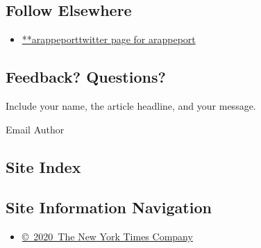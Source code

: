 \hypertarget{follow-elsewhere}{%
\subsection{Follow Elsewhere}\label{follow-elsewhere}}

\begin{itemize}
\tightlist
\item
  \href{https://twitter.com/arappeport}{**arappeporttwitter page for
  arappeport}
\end{itemize}

\hypertarget{feedback-questions}{%
\subsection{Feedback? Questions?}\label{feedback-questions}}

Include your name, the article headline, and your message.

Email Author

\hypertarget{site-index}{%
\subsection{Site Index}\label{site-index}}

\hypertarget{site-information-navigation}{%
\subsection{Site Information
Navigation}\label{site-information-navigation}}

\begin{itemize}
\tightlist
\item
  \href{https://help.nytimes.com/hc/en-us/articles/115014792127-Copyright-notice}{©~2020~The
  New York Times Company}
\end{itemize}

